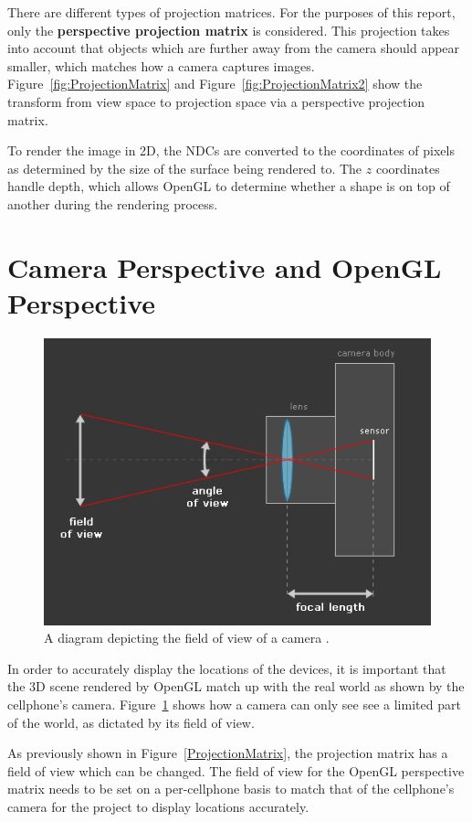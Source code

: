 There are different types of projection matrices. For the purposes of this report, only the \textbf{perspective projection matrix} is considered. This projection takes into account that objects which are further away from the camera should appear smaller, which matches how a camera captures images. Figure~\ref{fig:ProjectionMatrix} and Figure~\ref{fig:ProjectionMatrix2} show the transform from view space to projection space via a perspective projection matrix.

To render the image in 2D, the NDCs are converted to the coordinates of pixels as determined by the size of the surface being rendered to. The $z$ coordinates handle depth, which allows OpenGL to determine whether a shape is on top of another during the rendering process.

\section{Camera Perspective and OpenGL Perspective}
\begin{figure}
	\centering
	\includegraphics[width=\linewidth]{Figures/CameraLens.png}
	\decoRule
	\caption{A diagram depicting the field of view of a camera \cite{MartyBugs}.}
	\label{fig:CameraLens}
\end{figure}
In order to accurately display the locations of the devices, it is important that the 3D scene rendered by OpenGL match up with the real world as shown by the cellphone's camera. Figure~\ref{fig:CameraLens} shows how a camera can only see see a limited part of the world, as dictated by its field of view.

As previously shown in Figure~\ref{ProjectionMatrix}, the projection matrix has a field of view which can be changed. The field of view for the OpenGL perspective matrix needs to be set on a per-cellphone basis to match that of the cellphone's camera for the project to display locations accurately.


